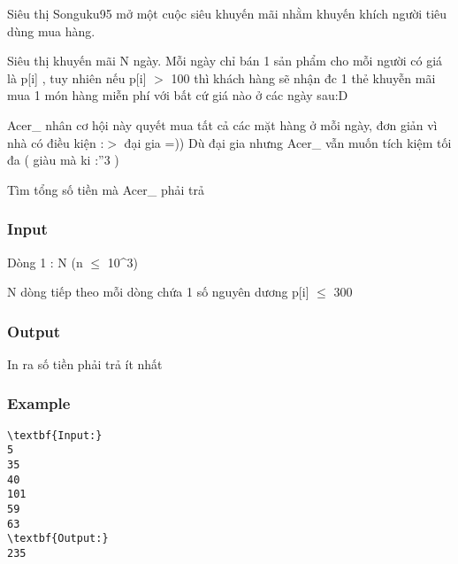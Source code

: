 

Siêu thị Songuku95 mở một cuộc siêu khuyến mãi nhằm khuyến khích người tiêu dùng mua hàng.

Siêu thị khuyến mãi N ngày. Mỗi ngày chỉ bán 1 sản phẩm cho mỗi người có giá là p[i] , tuy nhiên nếu p[i] $>$ 100 thì khách hàng sẽ nhận đc 1 thẻ khuyễn mãi mua 1 món hàng miễn phí với bất cứ giá nào ở các ngày sau:D

Acer\_ nhân cơ hội này quyết mua tất cả các mặt hàng ở mỗi ngày, đơn giản vì nhà có điều kiện :$>$ đại gia =)) Dù đại gia nhưng Acer\_ vẫn muốn tích kiệm tối đa ( giàu mà ki :”3 )

Tìm tổng số tiền mà Acer\_ phải trả

\subsubsection{Input}

Dòng 1 : N (n  $\le$  10\textasciicircum3)

N dòng tiếp theo mỗi dòng chứa 1 số nguyên dương p[i]  $\le$  300

\subsubsection{Output}

In ra số tiền phải trả ít nhất

\subsubsection{Example}
\begin{verbatim}
\textbf{Input:}
5
35
40
101
59
63
\textbf{Output:}
235\end{verbatim}

 
